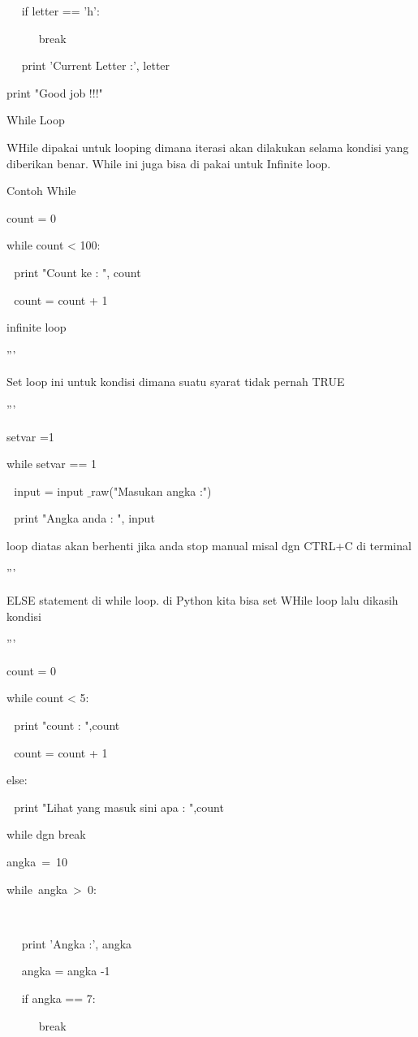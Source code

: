 ~~ if letter == 'h': \par
~~~~~ break \par
~~ print 'Current Letter :', letter \par
\vspace{12pt}
print "Good job !!!" \par
\vspace{12pt}
While Loop \par
WHile dipakai untuk looping dimana iterasi akan dilakukan selama kondisi yang diberikan benar. While ini juga bisa di pakai untuk Infinite loop. \par
\vspace{12pt}
Contoh While \par
count = 0 \par
while count < 100: \par
 $  $  $  $  $  $print "Count ke : ", count \par
 $  $  $  $  $  $count = count + 1 \par
\vspace{12pt}
infinite loop \par
''' \par
Set loop ini untuk kondisi dimana suatu syarat tidak pernah TRUE \par
''' \par
\vspace{12pt}
setvar =1 \par
while setvar == 1 \par
 $  $  $  $ input = input $  \_  $raw("Masukan angka :") \par
 $  $  $  $ print "Angka anda : ", input \par
\vspace{12pt}
loop diatas akan berhenti jika anda stop manual misal dgn CTRL+C di terminal \par
''' \par
ELSE statement di while loop. di Python kita bisa set WHile loop lalu dikasih kondisi \par
''' \par
count = 0 \par
while count < 5: \par
 $  $  $  $  $  $print "count : ",count \par
 $  $  $  $  $  $count = count + 1 \par
else: \par
 $  $  $  $ print "Lihat yang masuk sini apa : ",count \par
\vspace{12pt}
while dgn break \par
angka~=~10~~~~~~    \par
while~angka~>~0:~~~~~~~~~~     \par
~~  \par
~~ print 'Angka :', angka \par
~~ angka = angka -1 \par
~~ if angka == 7: \par
~~~~~ break \par
\vspace{\baselineskip}
\vspace{12pt}
\vspace{12pt}
